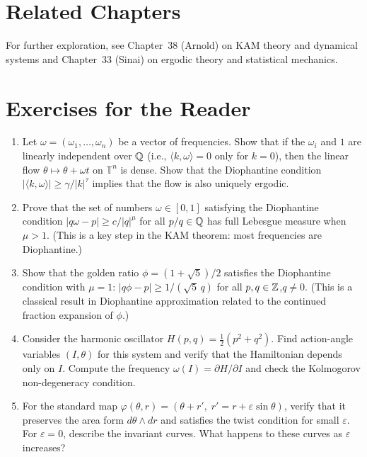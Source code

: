 \section{Related Chapters}
For further exploration, see Chapter~38 (Arnold) on KAM theory and dynamical systems and Chapter~33 (Sinai) on ergodic theory and statistical mechanics.

\section*{Exercises for the Reader}

\begin{enumerate}
\item [I] Let $\omega = (\omega_1, \dots, \omega_n)$ be a vector of frequencies. Show that if the $\omega_i$ and $1$ are linearly independent over $\mathbb{Q}$ (i.e., $\langle k, \omega \rangle = 0$ only for $k = 0$), then the linear flow $\theta \mapsto \theta + \omega t$ on $\mathbb{T}^n$ is dense. Show that the Diophantine condition $|\langle k, \omega \rangle| \geq \gamma/|k|^\tau$ implies that the flow is also uniquely ergodic.

\item [I] Prove that the set of numbers $\omega \in [0,1]$ satisfying the Diophantine condition $|q\omega - p| \geq c/|q|^{\mu}$ for all $p/q \in \mathbb{Q}$ has full Lebesgue measure when $\mu > 1$. (This is a key step in the KAM theorem: most frequencies are Diophantine.)

\item [B] Show that the golden ratio $\phi = (1+\sqrt{5})/2$ satisfies the Diophantine condition with $\mu = 1$: $|q\phi - p| \geq 1/(\sqrt{5}\,q)$ for all $p,q \in \mathbb{Z}$,$q \neq 0$. (This is a classical result in Diophantine approximation related to the continued fraction expansion of $\phi$.)

\item [B] Consider the harmonic oscillator $H(p,q) = \frac{1}{2}(p^2 + q^2)$. Find action-angle variables $(I,\theta)$ for this system and verify that the Hamiltonian depends only on $I$. Compute the frequency $\omega(I) = \partial H/\partial I$ and check the Kolmogorov non-degeneracy condition.

\item [I] For the standard map $\varphi(\theta, r) = (\theta + r',\; r' = r + \varepsilon \sin\theta)$, verify that it preserves the area form $d\theta \wedge dr$ and satisfies the twist condition for small $\varepsilon$. For $\varepsilon = 0$, describe the invariant curves. What happens to these curves as $\varepsilon$ increases?


\end{enumerate}
